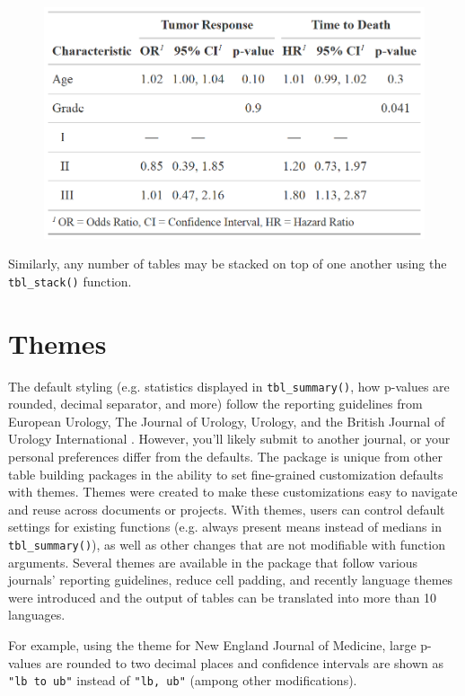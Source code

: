 \begin{figure}[h!]
  \includegraphics[scale=0.28]{merge.png}
  \centering
\end{figure}

Similarly, any number of  tables may be stacked on top of one another using the \texttt{tbl\_stack()} function.

\section{Themes}

The default styling (e.g. statistics displayed in \texttt{tbl\_summary()}, how p-values are rounded, decimal separator, and more) follow the reporting guidelines from European Urology, The Journal of Urology, Urology, and the British Journal of Urology International \citep{assel2019guidelines}.
However, you'll likely submit to another journal, or your personal preferences differ from the defaults.
The  package is unique from other table building packages in the ability to set fine-grained customization defaults with themes. 
Themes were created to make these customizations easy to navigate and reuse across documents or projects. 
With themes, users can control default settings for existing functions (e.g. always present means instead of medians in \texttt{tbl\_summary()}), as well as other changes that are not modifiable with function arguments.
Several themes are available in the package that follow various journals' reporting guidelines, reduce cell padding, and recently language themes were introduced and the output of  tables can be translated into more than 10 languages.

For example, using the theme for New England Journal of Medicine, large p-values are rounded to two decimal places and confidence intervals are shown as \texttt{"lb to ub"} instead of \texttt{"lb, ub"} (ampong other modifications). 

